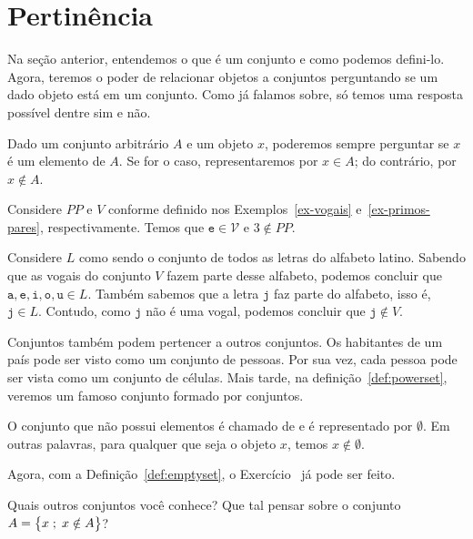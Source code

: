 \section{Pertinência}

Na seção anterior, entendemos o que é um conjunto e como podemos defini-lo.
Agora, teremos o poder de relacionar objetos a conjuntos perguntando se um dado objeto está em um conjunto.
Como já falamos sobre, só temos uma resposta possível dentre sim e não.

\begin{definition}
\label{def:in}
Dado um conjunto arbitrário $A$ e um objeto $x$,
poderemos sempre perguntar se $x$ é um elemento de $A$. Se for o caso, representaremos por $x \in A$; do contrário, por $x \notin A$.
\end{definition}

\begin{example}
Considere $PP$ e $V$ conforme definido nos Exemplos~\ref{ex-vogais} e~\ref{ex-primos-pares}, respectivamente. Temos que $\texttt{e} \in \mathcal{V}$ e $3 \notin PP$.
\end{example}

\begin{example}
Considere $L$ como sendo o conjunto de todos as letras do alfabeto latino.
Sabendo que as vogais do conjunto $V$ fazem parte desse alfabeto, podemos concluir que $\texttt{a}, \texttt{e}, \texttt{i}, \texttt{o}, \texttt{u} \in L$.
Também sabemos que a letra $\texttt{j}$ faz parte do alfabeto, isso é, $\texttt{j} \in L$.
Contudo, como $\texttt{j}$ não é uma vogal, podemos concluir que $\texttt{j} \notin V$.

\end{example}

\begin{example}
Conjuntos também podem pertencer a outros conjuntos.
Os habitantes de um país pode ser visto como um conjunto de pessoas.
Por sua vez, cada pessoa pode ser vista como um conjunto de células.
Mais tarde, na definição~\ref{def:powerset}, veremos um famoso conjunto formado por conjuntos.
\end{example}

\begin{definition}
\label{def:emptyset}
O conjunto que não possui elementos é chamado de  e é representado por $\emptyset$.
Em outras palavras, para qualquer que seja o objeto $x$, temos $x \notin \emptyset$.
\end{definition}

Agora, com a Definição~\ref{def:emptyset}, o Exercício~ já pode ser feito.

\begin{example}
Quais outros conjuntos você conhece? Que tal pensar sobre o conjunto $A = \left\{ x \;;\; x \notin A\right\}$?
\end{example}

